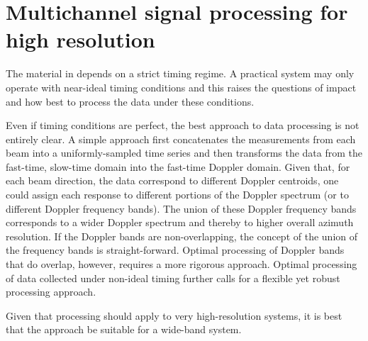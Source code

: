 \section{Multichannel signal processing for high resolution}
The material in  depends on a strict timing regime. A practical system may only operate with near-ideal timing conditions and this raises the questions of impact and how best to process the data under these conditions. 
\par
Even if timing conditions are perfect, the best approach to data processing is not entirely clear. A simple approach first concatenates the measurements from each beam into a uniformly-sampled time series and then transforms the data from the fast-time, slow-time domain into the fast-time Doppler domain. Given that, for each beam direction, the data correspond to different Doppler centroids, one could assign each response to different portions of the Doppler spectrum (or to different Doppler frequency bands). The union of these Doppler frequency bands corresponds to a wider Doppler spectrum and thereby to higher overall azimuth resolution. If the Doppler bands are non-overlapping, the concept of the union of the frequency bands is straight-forward. Optimal processing of Doppler bands that do overlap, however, requires a more rigorous approach. Optimal processing of data collected under non-ideal timing further calls for a flexible yet robust processing approach.
\par
Given that processing should apply to very high-resolution systems, it is best that the approach be suitable for a wide-band system. 
